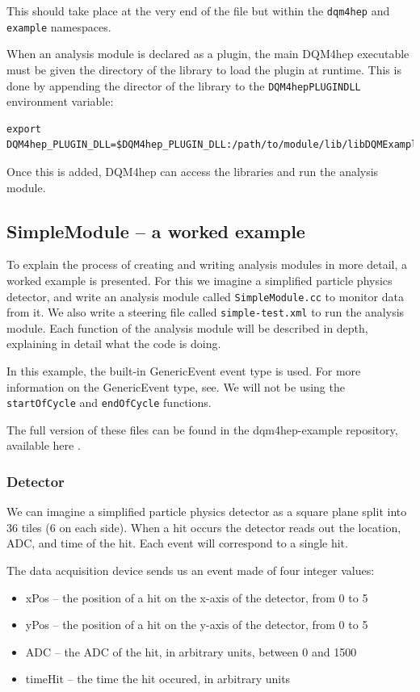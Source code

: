 This should take place at the very end of the file but within the \texttt{dqm4hep} and \texttt{example} namespaces.

When an analysis module is declared as a plugin, the main \acrshort{DQM4hep} executable must be given the directory of the library to load the plugin at runtime. This is done by appending the director of the library to the \texttt{DQM4hep\textunderscore PLUGIN\textunderscore DLL} environment variable:

\begin{lstlisting}
export DQM4hep_PLUGIN_DLL=$DQM4hep_PLUGIN_DLL:/path/to/module/lib/libDQMExample.so
\end{lstlisting}

Once this is added, \acrshort{DQM4hep} can access the libraries and run the analysis module.

\subsection{SimpleModule – a worked example} 
To explain the process of creating and writing analysis modules in more detail, a worked example is presented. For this we imagine a simplified particle physics detector, and write an analysis module called \texttt{SimpleModule.cc} to monitor data from it. We also write a steering file called \texttt{simple-test.xml} to run the analysis module. Each function of the analysis module will be described in depth, explaining in detail what the code is doing. 

In this example, the built-in GenericEvent event type is used. For more information on the GenericEvent type, see . We will not be using the \texttt{startOfCycle} and \texttt{endOfCycle} functions.

The full version of these files can be found in the dqm4hep-example repository, available here  .

\subsubsection{Detector}
We can imagine a simplified particle physics detector as a square plane split into 36 tiles (6 on each side). When a hit occurs the detector reads out the location, \acrshort{ADC}, and time of the hit. Each event will correspond to a single hit.

The data acquisition device sends us an event made of four integer values:

\begin{itemize}
	\item xPos -- the position of a hit on the x-axis of the detector, from 0 to 5
	\item yPos -- the position of a hit on the y-axis of the detector, from 0 to 5
	\item ADC -- the \acrshort{ADC} of the hit, in arbitrary units, between 0 and 1500
	\item timeHit -- the time the hit occured, in arbitrary units
\end{itemize}

